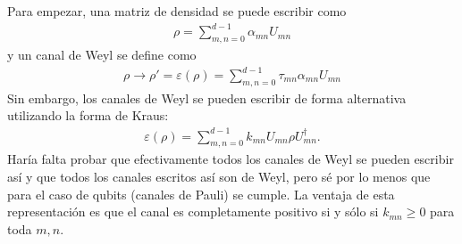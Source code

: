 Para empezar, una matriz de densidad se puede escribir como
\begin{align}
\label{mat densidad}
\rho = \sum_{m,n=0}^{d-1} \alpha_{mn} U_{mn}
\end{align}
y un canal de Weyl se define como
\begin{align}
\label{forma de bloch}
\rho \rightarrow \rho' = \varepsilon(\rho) = \sum_{m,n = 0}^{d-1} \tau_{mn} \alpha_{mn} U_{mn}
\end{align}
Sin embargo, los canales de Weyl se pueden escribir de forma alternativa utilizando la forma de Kraus:
\begin{align}
\label{Forma de Kraus}
\varepsilon(\rho) = \sum_{m,n=0}^{d-1} k_{mn} U_{mn} \rho U_{mn}^{\dagger}.
\end{align}
Haría falta probar que efectivamente todos los canales de Weyl se pueden escribir así y que todos los canales escritos así son de Weyl, pero sé por lo menos que para el caso de qubits (canales de Pauli) se cumple. La ventaja de esta representación es que el canal es completamente positivo si y sólo si $k_{mn} \geq 0$ para toda $m,n$.

